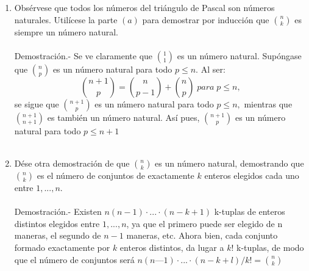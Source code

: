 \begin{enumerate}
\begin{enumerate}[\bfseries (a)]
          \item Obsérvese que todos los números del triángulo de Pascal son números naturales. Utilícese la parte $(a)$ para demostrar por inducción que $ {n \choose k}$ es siempre un número natural.\\\\
          Demostración.- \; Se ve claramente que ${1 \choose 1}$ es un número natural. Supóngase que ${n \choose p}$ es un número natural para todo $p \leq n$. Al ser: $${ n+1 \choose p } = {n \choose p-1} + {n \choose p} \; para \; p \leq n,$$ se sigue que ${n+1 \choose p}$ es un número natural para todo $p \leq n,$ mientras que ${n+1 \choose n+1}$ es también un número natural. Así pues, ${n+1 \choose p}$ es un número natural para todo $p \leq n+1$\\\\

          \item Dése otra demostración de que ${n \choose k}$ es un número natural, demostrando que ${n \choose k}$ es el número de conjuntos de exactamente $k$ enteros elegidos cada uno entre $1,...,n$.\\\\
          Demostración.- \; Existen $n(n -1) \cdot ... \cdot (n - k + 1)$ k-tuplas de enteros distintos elegidos entre $1, ..., n$, ya que el primero puede ser elegido de n maneras, el segundo de $n - 1$ maneras, etc. Ahora bien, cada conjunto formado exactamente por $k$ enteros distintos, da lugar a $k!$ k-tuplas, de
          modo que el número de conjuntos será $n(n — 1) \cdot ... \cdot (n - k + l)/k! = {n\choose k}$\\\\ 


\end{enumerate}
\end{enumerate}
